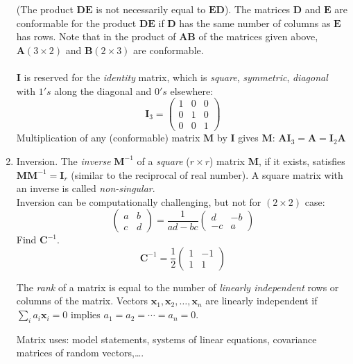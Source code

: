 \begin{enumerate}
(The product $\textbf{DE}$ is not necessarily equal to $\textbf{ED}$).  The matrices $\textbf{D}$ and $\textbf{E}$ are conformable for the product $\textbf{DE}$ if $\textbf{D}$ has the same number of columns as $\textbf{E}$ has rows.  Note that in the product of $\textbf{AB}$ of the matrices given above, $\textbf{A} (3 \times 2)$ and $\textbf{B} (2 \times 3)$ are conformable.\\~\\

$\textbf{I}$ is reserved for the {\em identity} matrix, which is {\em square},
{\em symmetric}, {\em diagonal} with $1's$ along the diagonal and $0's$
elsewhere:
$$ \textbf{I}_3 = \left(\begin{array}{ccc} 1 & 0 & 0 \\ 0 & 1 & 0 \\ 0 & 0 & 1 \end{array}\right) $$
Multiplication of any (conformable) matrix $\textbf{M}$ by $\textbf{I}$ gives $\textbf{M}$:
$\textbf{AI}_3 = \textbf{A} = \textbf{I}_2 \textbf{A}$
\item Inversion.  The {\em inverse} $\textbf{M}^{-1}$ of a {\em square} ($r \times r$) matrix $\textbf{M}$,
if it exists, satisfies $\textbf{MM}^{-1}=\textbf{I}_r$ (similar to the reciprocal of real number).  A square matrix with an inverse is called
{\em non-singular}.\\
Inversion can be computationally challenging, but not for
$(2 \times 2)$ case:
$$ \left(\begin{array}{cc} a & b \\ c & d \end{array}\right) = 
\frac{1}{ad-bc}
\left(\begin{array}{cc} d & -b \\ -c & a \end{array}\right) $$
Find $\textbf{C}^{-1}$.
$$\textbf{C}^{-1} = \frac{1}{2}\left(\begin{array}{cc} 1 & -1 \\ 1 & 1\end{array}\right)$$

The {\em rank} of a matrix is equal to the number of {\em linearly independent}
rows or columns of the matrix.  Vectors $\textbf{x}_1,\textbf{x}_2,\ldots,\textbf{x}_n$ are linearly independent
if $\sum_i a_i \textbf{x}_i = 0$ implies $a_1=a_2=\cdots=a_n=0$.

Matrix uses: model statements, systems of linear equations, covariance matrices of random vectors,\ldots.


\end{enumerate}
